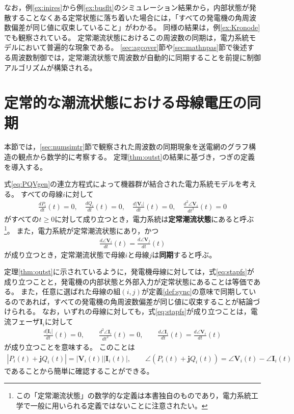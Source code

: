 \documentclass[tombow,dvipdfmx]{corona-a5-1.1}
\begin{document}
なお，例\ref{ex:inires}から例\ref{ex:busflt}のシミュレーション結果から，内部状態が発散することなくある定常状態に落ち着いた場合には，「すべての発電機の角周波数偏差が同じ値に収束していること」がわかる。
同様の結果は，例\ref{ex:Kronode}でも観察されている。
定常潮流状態におけるこの周波数の同期は，電力系統モデルにおいて普遍的な現象である。
\ref{sec:agcover}節や\ref{sec:mathnpas}節で後述する周波数制御では，定常潮流状態で周波数が自動的に同期することを前提に制御アルゴリズムが構築される。

\section{定常的な潮流状態における母線電圧の同期\advanced}\label{sec:phsync}

本節では，\ref{sec:numsimtr}節で観察された周波数の同期現象を送電網のグラフ構造の観点から数学的に考察する。
定理\ref{thm:outst}の結果に基づき，つぎの定義を導入する。

\begin{定義}[定常潮流状態と母線電圧の同期]
\label{def:sync}
式\ref{eq:PQVgen}の連立方程式によって機器群が結合された電力系統モデルを考える。
すべての母線$i$に対して
\begin{align}\label{eq:stapfs}
\frac{dP_i}{dt}(t)=0
,\quad
\frac{dQ_i}{dt}(t)=0
,\quad
\frac{d|\bm{V}_i|}{dt}(t)=0
,\quad
\frac{d^2 \angle \bm{V}_i }{dt^2}(t)=0
\end{align}
がすべての$t\geq0$に対して成り立つとき，電力系統は\textbf{定常潮流状態}にあると呼ぶ
\footnote{
この「定常潮流状態」の数学的な定義は本書独自のものであり，電力系統工学で一般に用いられる定義ではないことに注意されたい。
}。
また，電力系統が定常潮流状態にあり，かつ
\begin{align}\label{eq:defsyn}
\frac{d \angle \bm{V}_i}{dt}(t) =  \frac{d \angle \bm{V}_j}{dt}(t)
\end{align}
が成り立つとき，定常潮流状態で母線$i$と母線$j$は\textbf{同期}すると呼ぶ。
\end{定義}

定理\ref{thm:outst}に示されているように，発電機母線に対しては，式\ref{eq:stapfs}が成り立つことと，発電機の内部状態と外部入力が定常状態にあることは等価である。
また，任意に選ばれた母線の組$(i,j)$が定義\ref{def:sync}の意味で同期しているのであれば，すべての発電機の角周波数偏差が同じ値に収束することが結論づけられる。
なお，いずれの母線に対しても，式\ref{eq:stapfs}が成り立つことは，電流フェーザ$\bm{I}_i$に対して
\begin{align*}
\frac{d|\bm{I}_i|}{dt}(t)=0
,\qquad
\frac{d^2 \angle \bm{I}_i }{dt^2}(t)=0
,\qquad
\frac{d \angle \bm{I}_i }{dt}(t) = \frac{d \angle \bm{V}_i }{dt} (t)
\end{align*}
が成り立つことを意味する。
このことは
\begin{align*}
|P_i(t) + \bm{j} Q_i(t)| = |\bm{V}_i(t)| |\bm{I}_i(t)|
,\qquad
\angle(P_i(t) + \bm{j} Q_i(t)) = \angle \bm{V}_i(t) - \angle \bm{I}_i(t)
\end{align*}
であることから簡単に確認することができる。
\end{document}

